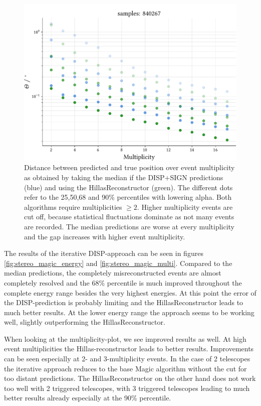 \begin{figure}
    \centering
    \captionsetup{width=0.9\linewidth}
    \includegraphics[width=0.9\linewidth]{../analysis/plots/gamma/median_vs_multi_comp.pdf}
    \caption{Distance between predicted and true position over event multiplicity as obtained by taking
    the median if the DISP+SIGN predictions (blue) and using the HillasReconstructor (green). 
    The different dots refer to the 25,50,68 and 90\% percentiles with 
    lowering alpha. Both algorithms require
    multiplicities $\geq 2$. Higher multiplicity events are cut off, because 
    statistical fluctuations dominate as not many events are recorded.
    The median predictions are worse at every multiplicity and the gap increases with higher event multiplicity.}
    \label{fig:stereo_median_multi}
\end{figure}

The results of the iterative DISP-approach can be seen in figures
\ref{fig:stereo_magic_energy} and \ref{fig:stereo_magic_multi}.
Compared to the median predictions, the completely misreconstructed events are almost
completely resolved and the 68\% percentile is much improved throughout the complete energy range besides 
the very highest energies. At this point the error of the DISP-prediction is probably limiting and the 
HillasReconstructor leads to much better results.
At the lower energy range the approach seems to be working well, 
slightly outperforming the HillasReconstructor.

When looking at the multiplicity-plot, we see improved results as well. 
At high event multiplicities the Hillas-reconstructor 
leads to better results. Improvements can be seen especially at 2- and 3-multiplicity 
events. In the case of 2 telescopes the iterative approach reduces to the 
base Magic algorithm without the cut for too distant predictions.
The HillasReconstructor on the other hand does not work too well with 2 
triggered telescopes, with 3 triggered telescopes leading to much better results 
already especially at the 90\% percentile.


